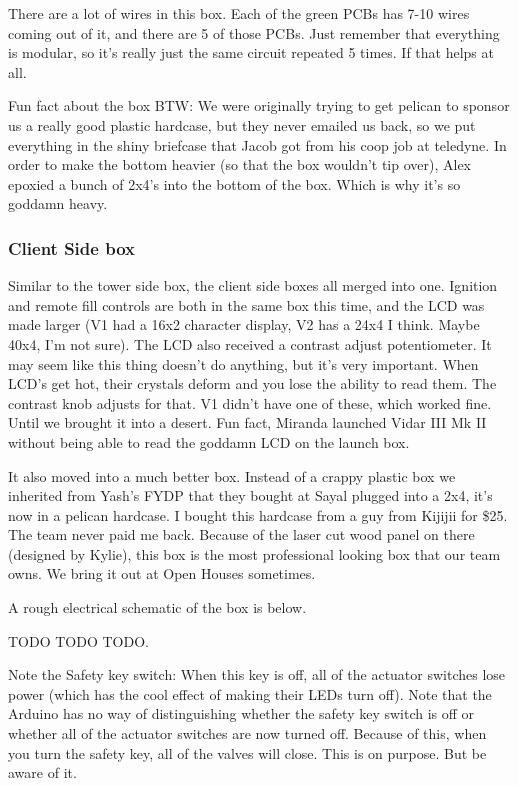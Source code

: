 \documentclass[11pt]{article}
\begin{document}
There are a lot of wires in this box. Each of the green PCBs has 7-10 wires
coming out of it, and there are 5 of those PCBs. Just remember that everything
is modular, so it's really just the same circuit repeated 5 times. If that helps
at all.

Fun fact about the box BTW: We were originally trying to get pelican to sponsor
us a really good plastic hardcase, but they never emailed us back, so we put
everything in the shiny briefcase that Jacob got from his coop job at
teledyne. In order to make the bottom heavier (so that the box wouldn't tip
over), Alex epoxied a bunch of 2x4's into the bottom of the box. Which is why
it's so goddamn heavy.

\subsubsection{Client Side box}
\label{sec:org2dcf9e8}

Similar to the tower side box, the client side boxes all merged into
one. Ignition and remote fill controls are both in the same box this time, and
the LCD was made larger (V1 had a 16x2 character display, V2 has a 24x4 I
think. Maybe 40x4, I'm not sure). The LCD also received a contrast adjust
potentiometer. It may seem like this thing doesn't do anything, but it's very
important. When LCD's get hot, their crystals deform and you lose the ability to
read them. The contrast knob adjusts for that. V1 didn't have one of these,
which worked fine. Until we brought it into a desert. Fun fact, Miranda launched
Vidar III Mk II without being able to read the goddamn LCD on the launch box.

It also moved into a much better box. Instead of a crappy plastic box we
inherited from Yash's FYDP that they bought at Sayal plugged into a 2x4, it's
now in a pelican hardcase. I bought this hardcase from a guy from Kijijii for
\$25. The team never paid me back. Because of the laser cut wood panel on there
(designed by Kylie), this box is the most professional looking box that our team
owns. We bring it out at Open Houses sometimes.

A rough electrical schematic of the box is below.

TODO TODO TODO.

Note the Safety key switch: When this key is off, all of the actuator switches
lose power (which has the cool effect of making their LEDs turn off). Note that
the Arduino has no way of distinguishing whether the safety key switch is off or
whether all of the actuator switches are now turned off. Because of this, when
you turn the safety key, all of the valves will close. This is on purpose. But
be aware of it.
\end{document}

